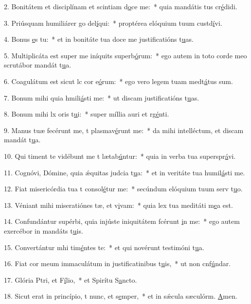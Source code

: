 2. Bonitátem et disciplínam et scintiam d\uline{o}ce me:~* quia mandátis tus cr\uline{é}didi.\par 
3. Priúsquam humiliárer go del\uline{í}qui:~* proptérea elóquium tuum custd\uline{í}vi.\par 
4. Bonus \uline{e}s tu:~* et in bonitáte tua doce me justificatións t\uline{u}as.\par 
5. Multiplicáta est super me iníquits superb\uline{ó}rum:~* ego autem in toto corde meo scrutábor mandát t\uline{u}a.\par 
6. Coagulátum est sicut lc cor e\uline{ó}rum:~* ego vero legem tuam medt\uline{á}tus sum.\par 
7. Bonum mihi quia hmili\uline{á}sti me:~* ut discam justificatións t\uline{u}as.\par 
8. Bonum mihi lx oris t\uline{u}i:~* super míllia auri et rg\uline{é}nti.\par 
9. Manus tuæ fecérunt me, t plasmav\uline{é}runt me:~* da mihi intelléctum, et discam mandát t\uline{u}a.\par 
10. Qui timent te vidébunt me t lætab\uline{ú}ntur:~* quia in verba tua superspr\uline{á}vi.\par 
11. Cognóvi, Dómine, quia ǽquitas judcia t\uline{u}a:~* et in veritáte tua humil\uline{á}sti me.\par 
12. Fiat misericórdia tua t consol\uline{é}tur me:~* secúndum elóquium tuum serv t\uline{u}o.\par 
13. Véniant mihi miseratiónes tæ, et v\uline{i}vam:~* quia lex tua meditáti m\uline{e}a est.\par 
14. Confundántur supérbi, quia injúste iniquitátem fcérunt \uline{i}n me:~* ego autem exercébor in mandáts t\uline{u}is.\par 
15. Convertántur mhi tim\uline{é}ntes te:~* et qui novérunt testimóni t\uline{u}a.\par 
16. Fiat cor meum immaculátum in justificatinibus t\uline{u}is,~* ut non cnf\uline{ú}ndar.\par 
17. Glória Ptri, et F\uline{í}lio,~* et Spirítu S\uline{a}ncto.\par 
18. Sicut erat in princípio, t nunc, et s\uline{e}mper,~* et in sǽcula sæculórm. \uline{A}men.\par 
